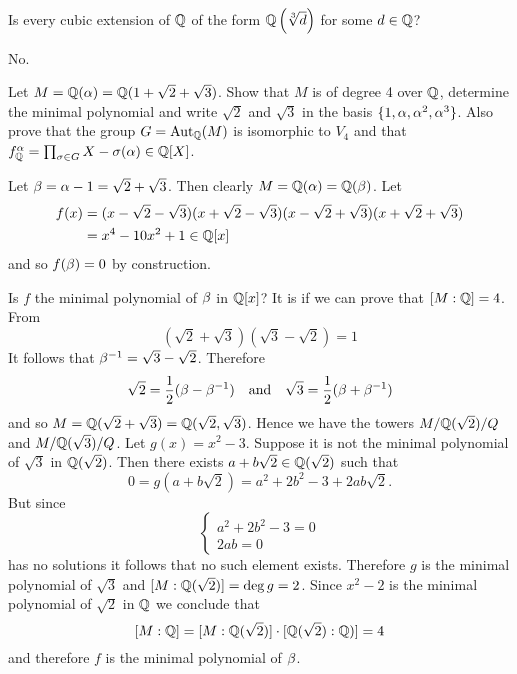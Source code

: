     \begin{ex}{21.24}
        Is every cubic extension of $\mathbb{Q}$ of the form $\mathbb{Q}\left(\sqrt[3]{d}\right)$ for some $d\in\mathbb{Q}$?
    \end{ex}
    \begin{sol}
        No.
    \end{sol}

    \begin{ex}{21.26}
        Let $M=\mathbb{Q}(\alpha)=\mathbb{Q}(1+\sqrt{2}+\sqrt{3})$. Show that $M$ is of degree 4 over $\mathbb{Q}$, determine the minimal polynomial and write $\sqrt{2}$ and $\sqrt{3}$ in the basis $\{1,\alpha, \alpha^2,\alpha^3\}$.
        Also prove that the group $G=\text{Aut}_{\mathbb{Q}}(M)$ is isomorphic to $V_4$ and that $f^\alpha_{\mathbb{Q}}=\prod_{\sigma\in G}X-\sigma(\alpha)\in\mathbb{Q}[X]$.
    \end{ex}
    \begin{sol}
        Let $\beta = \alpha-1=\sqrt{2}+\sqrt{3}$. Then clearly $M=\mathbb{Q}(\alpha)=\mathbb{Q}(\beta)$. Let
        \begin{align*}
            f(x)&=(x-\sqrt{2}-\sqrt{3})(x+\sqrt{2}-\sqrt{3})(x-\sqrt{2}+\sqrt{3})(x+\sqrt{2}+\sqrt{3})\\
            &=x^4-10x^2+1\in\mathbb{Q}[x]
        \end{align*}
        and so $f(\beta)=0$ by construction. 
        
        Is $f$ the minimal polynomial of $\beta$ in $\mathbb{Q}[x]$? It is if we can prove that $[M:\mathbb{Q}]=4$.
        From
        $$ (\sqrt{2}+\sqrt{3})(\sqrt{3}-\sqrt{2})=1 $$
        It follows that $\beta^{-1}=\sqrt{3}-\sqrt{2}$. Therefore
        $$ \sqrt{2}=\frac12(\beta-\beta^{-1})\quad\text{and}\quad\sqrt{3}=\frac12(\beta+\beta^{-1})$$
        and so $M=\mathbb{Q}(\sqrt{2}+\sqrt{3})=\mathbb{Q}(\sqrt{2},\sqrt{3})$. 
        Hence we have the towers $M/\mathbb{Q}(\sqrt{2})/Q$ and $M/\mathbb{Q}(\sqrt{3})/Q$. 
        Let $g(x)=x^2-3$. Suppose it is not the minimal polynomial of $\sqrt{3}$ in $\mathbb{Q}(\sqrt{2})$.
        Then there exists $a+b\sqrt{2}\in\mathbb{Q}(\sqrt{2})$ such that
        $$ 0 = g(a+b\sqrt{2})=a^2+2b^2-3+2ab\sqrt{2}.$$
        But since
        \begin{equation*}
            \begin{cases}
                a^2+2b^2-3=0\\
                2ab=0
            \end{cases}
        \end{equation*}
        has no solutions it follows that no such element exists.
        Therefore $g$ is the minimal polynomial of $\sqrt{3}$ and $[M:\mathbb{Q}(\sqrt{2})]=\deg g=2$.
        Since $x^2-2$ is the minimal polynomial of $\sqrt{2}$ in $\mathbb{Q}$ we conclude that 
        $$[M:\mathbb{Q}]=[M:\mathbb{Q}(\sqrt{2})]\cdot[\mathbb{Q}(\sqrt{2}):\mathbb{Q})]=4$$ 
        and therefore $f$ is the minimal polynomial of $\beta$.


\end{sol}
